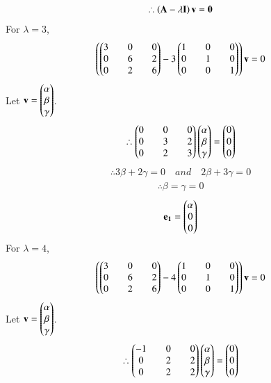 \documentclass[journal]{IEEEtran}
\begin{document}
\begin{align}
    \therefore \left(\mathbf{A}-\lambda\mathbf{I}\right)\mathbf{v}=\mathbf{0}
\end{align}
For $\lambda=3$,
\begin{align}
    \left(\begin{pmatrix}3&&0&&0\\0&&6&&2\\0&&2&&6\end{pmatrix}-3\begin{pmatrix}1&&0&&0\\0&&1&&0\\0&&0&&1\end{pmatrix}\right)\mathbf{v}=0
\end{align}
Let $\mathbf{v}=\begin{pmatrix}\alpha\\\beta\\\gamma\end{pmatrix}$.
\begin{align}
    \therefore \begin{pmatrix}0&&0&&0\\0&&3&&2\\0&&2&&3\end{pmatrix}\begin{pmatrix}\alpha\\\beta\\\gamma\end{pmatrix}=\begin{pmatrix}0\\0\\0\end{pmatrix} 
\end{align}
\begin{align}
    \therefore 3\beta+2\gamma=0 \quad and \quad 2\beta+3\gamma=0
\end{align}
\begin{align}
    \therefore \beta=\gamma=0
\end{align}
\begin{align}
    \mathbf{e_1}=\begin{pmatrix}\alpha\\0\\0\end{pmatrix}
\end{align}
\newpage
\vspace*{0.25cm}
For $\lambda=4$,
\begin{align}
    \left(\begin{pmatrix}3&&0&&0\\0&&6&&2\\0&&2&&6\end{pmatrix}-4\begin{pmatrix}1&&0&&0\\0&&1&&0\\0&&0&&1\end{pmatrix}\right)\mathbf{v}=0
\end{align}
Let $\mathbf{v}=\begin{pmatrix}\alpha\\\beta\\\gamma\end{pmatrix}$.
\begin{align}
    \therefore \begin{pmatrix}-1&&0&&0\\0&&2&&2\\0&&2&&2\end{pmatrix}\begin{pmatrix}\alpha\\\beta\\\gamma\end{pmatrix}=\begin{pmatrix}0\\0\\0\end{pmatrix} 
\end{align}
\end{document}
